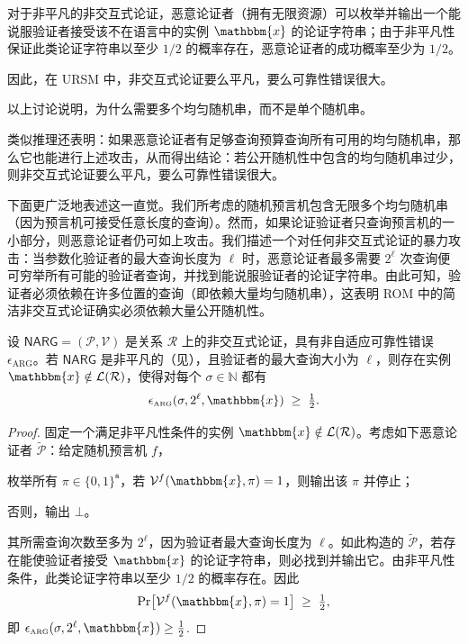 \documentclass[american,singlepageview]{snargs-book-zh}
\newcommand{\Bits}{\{0,1\}}
\newcommand{\Malicious}[1]{\tilde{#1}}
\newcommand{\Naturals}{\mathbb{N}}
\newcommand{\Relation}{\mathcal{R}}
\newcommand{\Language}{\mathcal{L}}
\newcommand{\GetLanguage}[1]{\Language(#1)}
\newcommand{\Instance}{\mathbbm{x}}
\newcommand{\ProtoProver}{P}
\newcommand{\ProtoVerifier}{V}
\newcommand{\ProtoSoundnessError}{\epsilon}
\newcommand{\NARGSymbol}{\mathsf{NARG}}
\newcommand{\ARGSubscript}{\scriptscriptstyle\mathrm{ARG}}
\newcommand{\ARGFormat}[1]{\mathcal{#1}}
\newcommand{\ARGProver}{\ARGFormat{\ProtoProver}}
\newcommand{\ARGVerifier}{\ARGFormat{\ProtoVerifier}}
\newcommand{\ARGSystem}{(\ARGProver,\ARGVerifier)}
\newcommand{\ARGString}{\pi}
\newcommand{\ARGNASoundnessError}{\ProtoSoundnessError_{\ARGSubscript}}
\newcommand{\ARGComplexityFormat}[1]{\mathbf{#1}}
\newcommand{\ARGLength}{\ARGComplexityFormat{s}}
\newcommand{\ROFunction}{f}
\newcommand{\ROOutputSize}{\sigma}
\begin{document}
对于非平凡的非交互式论证，恶意论证者（拥有无限资源）可以枚举并输出一个能说服验证者接受该不在语言中的实例 $\Instance$ 的论证字符串；由于非平凡性保证此类论证字符串以至少 $1/2$ 的概率存在，恶意论证者的成功概率至少为 $1/2$。

因此，在 URSM 中，非交互式论证要么平凡，要么可靠性错误很大。

以上讨论说明，为什么需要多个均匀随机串，而不是单个随机串。

类似推理还表明：如果恶意论证者有足够查询预算查询所有可用的均匀随机串，那么它也能进行上述攻击，从而得出结论：若公开随机性中包含的均匀随机串过少，则非交互式论证要么平凡，要么可靠性错误很大。

下面更广泛地表述这一直觉。我们所考虑的随机预言机包含无限多个均匀随机串（因为预言机可接受任意长度的查询）。然而，如果论证验证者只查询预言机的一小部分，则恶意论证者仍可如上攻击。我们描述一个对任何非交互式论证的暴力攻击：当参数化验证者的最大查询长度为 $\ell$ 时，恶意论证者最多需要 $2^\ell$ 次查询便可穷举所有可能的验证者查询，并找到能说服验证者的论证字符串。由此可知，验证者必须依赖在许多位置的查询（即依赖大量均匀随机串），这表明 ROM 中的简洁非交互式论证确实必须依赖大量公开随机性。

\begin{lemma}
\label{lemma:ursm-limitation}
设 $\NARGSymbol=\ARGSystem$ 是关系 $\Relation$ 上的非交互式论证，具有非自适应可靠性错误 $\ARGNASoundnessError$。若 $\NARGSymbol$ 是非平凡的（见），且验证者的最大查询大小为 $\ell$，则存在实例 $\Instance\notin\GetLanguage{\Relation}$，使得对每个 $\ROOutputSize\in\Naturals$ 都有
\[
  \ARGNASoundnessError(\ROOutputSize,2^{\ell},\Instance)\;\ge\;\tfrac12.
\]
\end{lemma}

\begin{proof}
固定一个满足非平凡性条件的实例 $\Instance\notin\GetLanguage{\Relation}$。考虑如下恶意论证者 $\Malicious{\ARGProver}$：给定随机预言机 $\ROFunction$，
\begin{inparaenum}[(i)]
  \item 枚举所有 $\ARGString\in\Bits^{\ARGLength}$，若 $\ARGVerifier^{\ROFunction}(\Instance,\ARGString)=1$，则输出该 $\ARGString$ 并停止；
  \item 否则，输出 $\bot$。
\end{inparaenum}
其所需查询次数至多为 $2^{\ell}$，因为验证者最大查询长度为 $\ell$。如此构造的 $\Malicious{\ARGProver}$，若存在能使验证者接受 $\Instance$ 的论证字符串，则必找到并输出它。由非平凡性条件，此类论证字符串以至少 $1/2$ 的概率存在。因此
\[
  \Pr\bigl[\ARGVerifier^{\ROFunction}(\Instance,\ARGString)=1\bigr]
  \;\ge\;\tfrac12,
\]
即
\(
  \ARGNASoundnessError(\ROOutputSize,2^{\ell},\Instance)\ge\tfrac12
\).
\end{proof}
\end{document}
